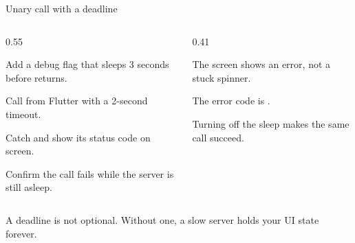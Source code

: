 \documentclass[10pt,aspectratio=169,t]{beamer}
\begin{document}
\begin{frame}[fragile,eyebrow=Task II]{Unary call with a deadline}
  \begin{columns}[T]
    \begin{column}{0.55\textwidth}
      \begin{steps}
        \item Add a debug flag that sleeps 3 seconds before  returns.
        \item Call  from Flutter with a 2-second  timeout.
        \item Catch  and show its status code on screen.
        \item Confirm the call fails while the server is still asleep.
      \end{steps}
    \end{column}
    \begin{column}{0.41\textwidth}
      \begin{checklist}
        \item The screen shows an error, not a stuck spinner.
        \item The error code is .
        \item Turning off the sleep makes the same call succeed.
      \end{checklist}
    \end{column}
  \end{columns}
  \begin{takeaway}{A deadline is not optional.}
    Without one, a slow server holds your UI state forever.
  \end{takeaway}
\end{frame}
\end{document}
